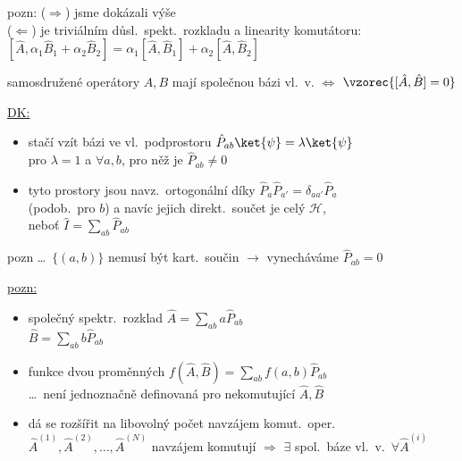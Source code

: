 \documentclass[11pt,a4paper]{article}
\begin{document}
pozn: \quad ($\Rightarrow$) jsme dokázali výše \\
\phantom{pozn:} \quad ($\Leftarrow$) je triviálním důsl.\ spekt.\ rozkladu a linearity komutátoru: \\
\phantom{pozn:} \quad\quad $[\hat A,\alpha_1\hat B_1 + \alpha_2\hat B_2] = \alpha_1[\hat A,\hat B_1] + \alpha_2[\hat A,\hat B_2]$

\begin{veta}[VĚTA]
samosdružené operátory $A, B$ mají společnou bázi vl.\ v. \quad $\Leftrightarrow$ \quad $\vzorec{[\hat A,\hat B] = 0}$
\end{veta}

\underline{DK:}
\begin{itemize}[nosep]
  \item[--] stačí vzít bázi ve vl.\ podprostoru $\hat P_{ab}\ket{\psi} = \lambda\ket{\psi}$ \\
            pro $\lambda = 1$ a $\forall a,b$, pro něž je $\hat P_{ab}\neq 0$
  \item[$\to$] tyto prostory jsou navz.\ ortogonální díky $\hat P_a\hat P_{a'} = \delta_{aa'}\hat P_a$ \\
            (podob.\ pro $b$) a navíc jejich direkt.\ součet je celý $\mathcal{H}$, \\
            neboť \quad $\hat I = \sum_{ab}\hat P_{ab}$ \quad {}
\end{itemize}
pozn \dots\ $\{(a,b)\}$ nemusí být kart.\ součin $\to$ vynecháváme $\hat P_{ab} = 0$

\underline{pozn:}
\begin{itemize}
  \item společný spektr.\ rozklad \quad
        $\hat A = \sum_{ab}a\hat P_{ab}$ \quad {} \\
        \phantom{společný spektr.\ rozklad} \quad $\hat B = \sum_{ab}b\hat P_{ab}$ \quad {}
  \item funkce dvou proměnných \quad $f(\hat A,\hat B) = \sum_{ab}f(a,b)\hat P_{ab}$ \\
        \dots\ není jednoznačně definovaná pro nekomutující $\hat A,\hat B$
  \item dá se rozšířit na libovolný počet navzájem komut.\ oper. \\
        $\hat A^{(1)},\hat A^{(2)},\dots,\hat A^{(N)}$ navzájem komutují $\Rightarrow$ $\exists$ spol.\ báze vl.\ v.\ $\forall\hat A^{(i)}$
\end{itemize}
\end{document}
